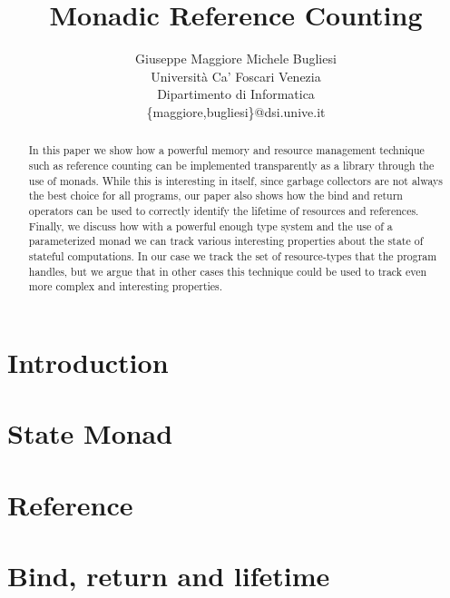 \documentclass[a4paper]{article}
\begin{document}
\title{\bf Monadic Reference Counting}

\author{Giuseppe Maggiore \quad
		  Michele Bugliesi
 \\ Universit\`a Ca' Foscari Venezia
 \\ Dipartimento di Informatica 
 \\ \{maggiore,bugliesi\}@dsi.unive.it
}

\date{}
\maketitle

\begin{abstract}
In this paper we show how a powerful memory and resource management technique such as reference counting can be implemented transparently as a library through the use of monads. While this is interesting in itself, since garbage collectors are not always the best choice for all programs, our paper also shows how the bind and return operators can be used to correctly identify the lifetime of resources and references. Finally, we discuss how with a powerful enough type system and the use of a parameterized monad we can track various interesting properties about the state of stateful computations. In our case we track the set of resource-types that the program handles, but we argue that in other cases this technique could be used to track even more complex and interesting properties.
\end{abstract}

\section{Introduction}
\label{sec:intro}
 

\section{State Monad}
\label{sec:state_monad}
 

\section{Reference}
\label{sec:reference}
 

\section{Bind, return and lifetime}
\label{sec:scoping_state_monad}
 
\end{document}
